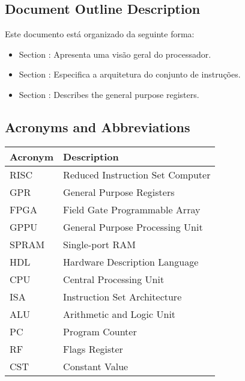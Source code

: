 \documentclass{article}
\begin{document}
  \subsection{Document Outline Description}
  Este documento está organizado da seguinte forma:
	
	\begin{itemize}
	  \item Section \color{black}{\ref{sec:design_overview}}: Apresenta uma visão geral do processador. 
	  \item Section \color{black}{\ref{sec:isa}}: Especifica a arquitetura do conjunto de instruções.
	  \item Section \color{black}{\ref{sec:register}}: Describes the general purpose registers.
	\end{itemize}
		
  \subsection{Acronyms and Abbreviations}
  
  \FloatBarrier
  \begin{table}[H]
    \begin{center}
      \begin{tabular}[pos]{|m{2cm} | m{9cm}|} 
	\hline
	\cellcolor[gray]{0.9}\textbf{Acronym} & \cellcolor[gray]{0.9}\textbf{Description} \\ \hline
	    RISC   & Reduced Instruction Set Computer \\ \hline
	    GPR    & General Purpose Registers \\ \hline
	    FPGA   & Field Gate Programmable Array \\ \hline
	    GPPU   & General Purpose Processing Unit \\ \hline
	    SPRAM  & Single-port RAM \\ \hline	    
	    HDL    & Hardware Description Language \\ \hline
	    CPU    & Central Processing Unit \\ \hline
	    ISA    & Instruction Set Architecture \\ \hline
	    ALU    & Arithmetic and Logic Unit \\ \hline
	    PC     & Program Counter \\ \hline
	    RF     & Flags Register \\ \hline
	    CST    & Constant Value \\ \hline
      \end{tabular}
    \end{center}
  \end{table}
  
\end{document}

